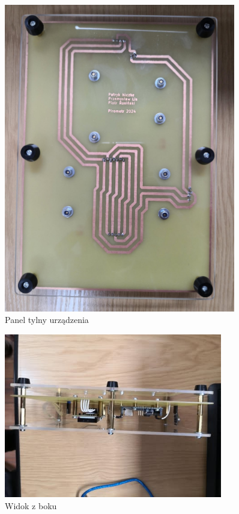 \begin{figure}[h!]
    \centering
    \includegraphics[width=0.9\textwidth]{images/tyl.jpg}
    \caption{Panel tylny urządzenia}
    \label{fig:tylny_panel}
\end{figure}

\begin{figure}[h!]
    \centering
    \includegraphics[width=0.85\textwidth]{images/bok2.jpg}
    \caption{Widok z boku}
    \label{fig:widok_z_boku3}
\end{figure}

